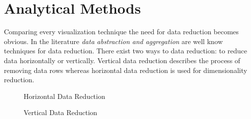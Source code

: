 \section{Analytical Methods}\label{analytical}
Comparing every visualization technique the need for data reduction becomes obvious. In the literature \textit{data abstraction and aggregation} are well know techniques for data reduction\cite{FerreiradeOliveira2003,Aigner2011, Keim2005}. There exist two ways to data reduction: to reduce data horizontally or vertically. 
Vertical data reduction describes the process of removing data rows whereas horizontal data reduction is used for dimensionality reduction. 
\begin{figure}[H]
    \centering
    \caption{Horizontal Data Reduction}
    \label{fig:my_label}
\end{figure}

\begin{figure}[H]
    \centering
    \caption{Vertical Data Reduction}
    \label{fig:my_label}
\end{figure}

